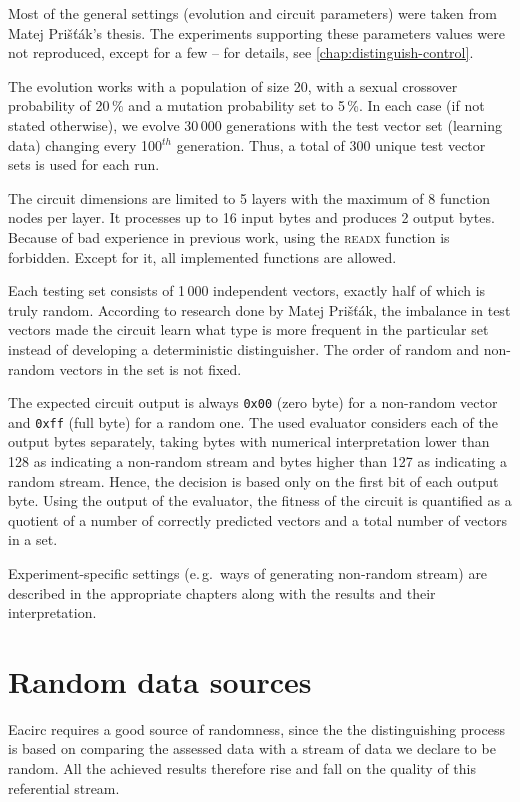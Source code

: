 \documentclass[12pt,oneside]{fithesis2}
\begin{document}
Most of the general settings (evolution and circuit parameters) were taken from Matej Prišťák's thesis. 
The experiments supporting these parameters values were not reproduced, except for a few -- for details,
see \autoref{chap:distinguish-control}.

The evolution works with a population of size 20, with a sexual crossover probability of 20\,\% and a mutation probability
set to 5\,\%. In each case (if not stated otherwise), we evolve 30\,000 generations with the test vector set
(learning data) changing every 100${}^{th}$ generation. Thus, a total of 300 unique test vector sets is used for each run.

The circuit dimensions are limited to 5 layers with the maximum of 8 function nodes per layer. It processes up to 16 input bytes
and produces 2 output bytes. Because of bad experience in previous work, using the \textsc{readx} function is forbidden.
Except for it, all implemented functions are allowed.

Each testing set consists of 1\,000 independent vectors, exactly half of which is truly random. 
According to research done by Matej Prišťák, the imbalance in test vectors made the circuit learn what type is more frequent
in the particular set instead of developing a deterministic distinguisher. 
The order of random and non-random vectors in the set is not fixed.

The expected circuit output is always \texttt{0x00} (zero byte) for a non-random vector and \texttt{0xff} (full byte) 
for a random one.
The used evaluator considers each of the output bytes separately, taking bytes with numerical interpretation lower than
128 as indicating a non-random stream and bytes higher than 127 as indicating a random stream.
Hence, the decision is based only on the first bit of each output byte.
Using the output of the evaluator, the fitness of the circuit is quantified as a quotient of a number of 
correctly predicted vectors and a total number of vectors in a set.

Experiment-specific settings (e.\,g.\ ways of generating non-random stream) are described in the 
appropriate chapters along with the results and their interpretation.

\section{Random data sources}
\label{sec:settings-random}

Eacirc requires a good source of randomness, since the the distinguishing process is based on comparing the assessed data
with a stream of data we declare to be random. All the achieved results therefore rise and fall 
on the quality of this referential stream.
\end{document}
